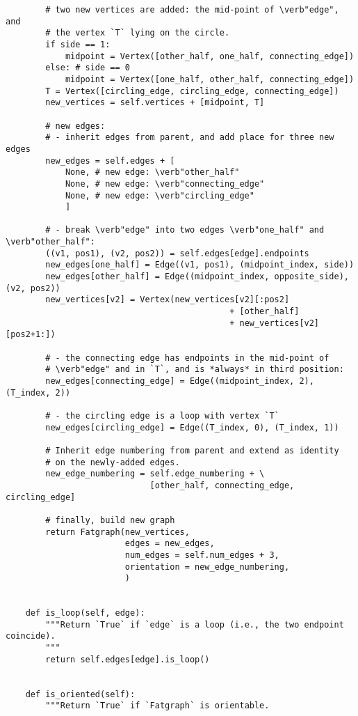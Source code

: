 \begin{lstlisting}
        # two new vertices are added: the mid-point of \verb"edge", and
        # the vertex `T` lying on the circle.
        if side == 1:
            midpoint = Vertex([other_half, one_half, connecting_edge])
        else: # side == 0
            midpoint = Vertex([one_half, other_half, connecting_edge])
        T = Vertex([circling_edge, circling_edge, connecting_edge])
        new_vertices = self.vertices + [midpoint, T]

        # new edges:
        # - inherit edges from parent, and add place for three new edges
        new_edges = self.edges + [
            None, # new edge: \verb"other_half"
            None, # new edge: \verb"connecting_edge"
            None, # new edge: \verb"circling_edge"
            ]
        
        # - break \verb"edge" into two edges \verb"one_half" and \verb"other_half":
        ((v1, pos1), (v2, pos2)) = self.edges[edge].endpoints
        new_edges[one_half] = Edge((v1, pos1), (midpoint_index, side))
        new_edges[other_half] = Edge((midpoint_index, opposite_side), (v2, pos2))
        new_vertices[v2] = Vertex(new_vertices[v2][:pos2]
                                             + [other_half]
                                             + new_vertices[v2][pos2+1:])

        # - the connecting edge has endpoints in the mid-point of
        # \verb"edge" and in `T`, and is *always* in third position:
        new_edges[connecting_edge] = Edge((midpoint_index, 2), (T_index, 2))

        # - the circling edge is a loop with vertex `T`
        new_edges[circling_edge] = Edge((T_index, 0), (T_index, 1))

        # Inherit edge numbering from parent and extend as identity
        # on the newly-added edges.
        new_edge_numbering = self.edge_numbering + \
                             [other_half, connecting_edge, circling_edge]

        # finally, build new graph 
        return Fatgraph(new_vertices,
                        edges = new_edges,
                        num_edges = self.num_edges + 3,
                        orientation = new_edge_numbering,
                        )
    

    def is_loop(self, edge):
        """Return `True` if `edge` is a loop (i.e., the two endpoint coincide).
        """
        return self.edges[edge].is_loop()
        

    def is_oriented(self):
        """Return `True` if `Fatgraph` is orientable.


\end{lstlisting}
